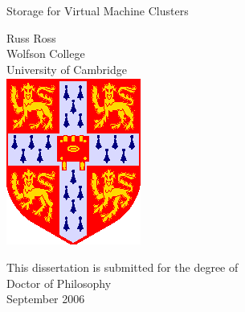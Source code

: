 \pagestyle{empty}

\begin{center}
\vspace*{\fill}

%

\Huge
Storage for Virtual Machine Clusters

\vfill
\vfill

\LARGE 
Russ Ross\\[6mm]
Wolfson College\\
University of Cambridge\\

\vfill
\includegraphics{eps/CUArms-colour.eps}
\vfill

\Large
This dissertation is submitted for the degree of\\
Doctor of Philosophy\\[4mm]

September 2006

\vspace*{\fill}
\end{center}
\cleardoublepage

\pagestyle{plain}

%

\enlargethispage*{60cm}        %
{
  
}

\cleardoublepage

%

\enlargethispage*{60cm}        %
 {
        
 }

\cleardoublepage

%

